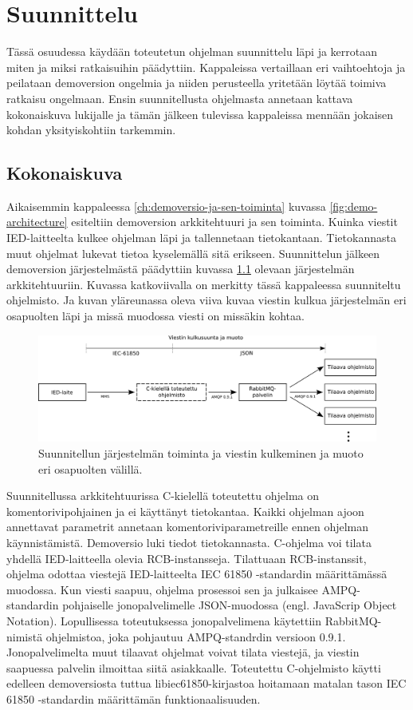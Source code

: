\chapter{Suunnittelu}
\label{ch:suunnittelu}
Tässä osuudessa käydään toteutetun ohjelman suunnittelu läpi ja kerrotaan miten ja miksi ratkaisuihin päädyttiin. Kappaleissa vertaillaan eri vaihtoehtoja ja peilataan demoversion ongelmia ja niiden perusteella yritetään löytää toimiva ratkaisu ongelmaan. Ensin suunnitellusta ohjelmasta annetaan kattava kokonaiskuva lukijalle ja tämän jälkeen tulevissa kappaleissa mennään jokaisen kohdan yksityiskohtiin tarkemmin.


\section{Kokonaiskuva}
Aikaisemmin kappaleessa \ref{ch:demoversio-ja-sen-toiminta} kuvassa \ref{fig:demo-architecture} esiteltiin demoversion arkkitehtuuri ja sen toiminta. Kuinka viestit IED-laitteelta kulkee ohjelman läpi ja tallennetaan tietokantaan. Tietokannasta muut ohjelmat lukevat tietoa kyselemällä sitä erikseen. Suunnittelun jälkeen demoversion järjestelmästä päädyttiin kuvassa \ref{fig:planned-system-architecture} olevaan järjestelmän arkkitehtuuriin. Kuvassa katkoviivalla on merkitty tässä kappaleessa suunniteltu ohjelmisto. Ja kuvan yläreunassa oleva viiva kuvaa viestin kulkua järjestelmän eri osapuolten läpi ja missä muodossa viesti on missäkin kohtaa.

\begin{figure}[ht!]
	\includegraphics[width=1\textwidth]{pictures/planned-system-architecture.png}
	\caption{Suunnitellun järjestelmän toiminta ja viestin kulkeminen ja muoto eri osapuolten välillä.}
	\label{fig:planned-system-architecture}
\end{figure}

Suunnitellussa arkkitehtuurissa C-kielellä toteutettu ohjelma on komentorivipohjainen ja ei käyttänyt tietokantaa. Kaikki ohjelman ajoon annettavat parametrit annetaan komentoriviparametreille ennen ohjelman käynnistämistä. Demoversio luki tiedot tietokannasta. C-ohjelma voi tilata yhdellä IED-laitteella olevia RCB-instansseja. Tilattuaan RCB-instanssit, ohjelma odottaa viestejä IED-laitteelta IEC 61850 -standardin määrittämässä muodossa. Kun viesti saapuu, ohjelma prosessoi sen ja julkaisee AMPQ-standardin pohjaiselle jonopalvelimelle JSON-muodossa (engl. JavaScrip Object Notation). Lopullisessa toteutuksessa jonopalvelimena käytettiin RabbitMQ-nimistä ohjelmistoa, joka pohjautuu AMPQ-standrdin versioon 0.9.1. Jonopalvelimelta muut tilaavat ohjelmat voivat tilata viestejä, ja viestin saapuessa palvelin ilmoittaa siitä asiakkaalle. Toteutettu C-ohjelmisto käytti edelleen demoversiosta tuttua libiec61850-kirjastoa hoitamaan matalan tason IEC 61850 -standardin määrittämän funktionaalisuuden.


